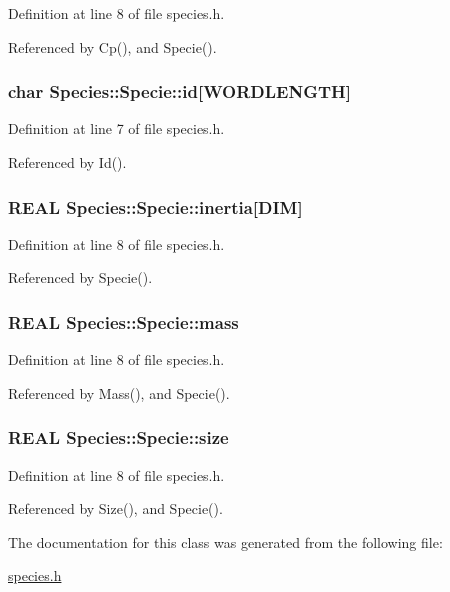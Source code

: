 Definition at line 8 of file species.h.

Referenced by Cp(), and Specie().\hypertarget{classSpecies_1_1Specie_a6bf75e40fc5cc07ae2a91897faebd93}{
\subsubsection[{id}]{\setlength{\rightskip}{0pt plus 5cm}char {\bf Species::Specie::id}\mbox{[}WORDLENGTH\mbox{]}}}
\label{classSpecies_1_1Specie_a6bf75e40fc5cc07ae2a91897faebd93}




Definition at line 7 of file species.h.

Referenced by Id().\hypertarget{classSpecies_1_1Specie_9cc631ced72a9e28b68f32853b281799}{
\subsubsection[{inertia}]{\setlength{\rightskip}{0pt plus 5cm}REAL {\bf Species::Specie::inertia}\mbox{[}DIM\mbox{]}}}
\label{classSpecies_1_1Specie_9cc631ced72a9e28b68f32853b281799}




Definition at line 8 of file species.h.

Referenced by Specie().\hypertarget{classSpecies_1_1Specie_301c93ea3dbad326013bcd64d7ea19ab}{
\subsubsection[{mass}]{\setlength{\rightskip}{0pt plus 5cm}REAL {\bf Species::Specie::mass}}}
\label{classSpecies_1_1Specie_301c93ea3dbad326013bcd64d7ea19ab}




Definition at line 8 of file species.h.

Referenced by Mass(), and Specie().\hypertarget{classSpecies_1_1Specie_35c31567c4517b068312e15b4539e01f}{
\subsubsection[{size}]{\setlength{\rightskip}{0pt plus 5cm}REAL {\bf Species::Specie::size}}}
\label{classSpecies_1_1Specie_35c31567c4517b068312e15b4539e01f}




Definition at line 8 of file species.h.

Referenced by Size(), and Specie().

The documentation for this class was generated from the following file:\begin{CompactItemize}
\item 
\hyperlink{species_8h}{species.h}\end{CompactItemize}

